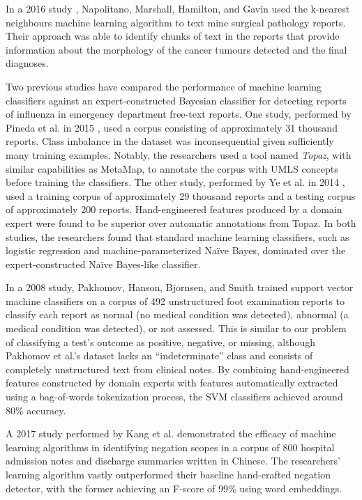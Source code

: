 \documentclass[sigconf]{acmart}
\newcommand{\naive}{Na\"ive }
\begin{document}
In a 2016 study \cite{napolitano2016machine}, Napolitano, Marshall, Hamilton, and Gavin used the k-nearest neighbours machine learning algorithm to text mine surgical pathology reports. Their approach was able to identify chunks of text in the reports that provide information about the morphology of the cancer tumours detected and the final diagnoses.

Two previous studies have compared the performance of machine learning classifiers against an expert-constructed Bayesian classifier for detecting reports of influenza in emergency department free-text reports. One study, performed by Pineda et al. in 2015 \cite{pineda2015comparison}, used a corpus consisting of approximately 31 thousand reports. Class imbalance in the dataset was inconsequential given sufficiently many training examples. Notably, the researchers used a tool named \textit{Topaz}, with similar capabilities as MetaMap, to annotate the corpus with UMLS concepts before training the classifiers. The other study, performed by Ye et al. in 2014 \cite{ye2014influenza}, used a training corpus of approximately 29 thousand reports and a testing corpus of approximately 200 reports. Hand-engineered features produced by a domain expert were found to be superior over automatic annotations from Topaz. In both studies, the researchers found that standard machine learning classifiers, such as logistic regression and machine-parameterized \naive Bayes, dominated over the expert-constructed \naive Bayes-like classifier.

In a 2008 study, Pakhomov, Hanson, Bjornsen, and Smith \cite{pakhomov2008automatic} trained support vector machine classifiers on a corpus of 492 unstructured foot examination reports to classify each report as normal (no medical condition was detected), abnormal (a medical condition was detected), or not assessed. This is similar to our problem of classifying a test's outcome as positive, negative, or missing, although Pakhomov et al.'s dataset lacks an ``indeterminate'' class and consists of completely unstructured text from clinical notes. By combining hand-engineered features constructed by domain experts with features automatically extracted using a bag-of-words tokenization process, the SVM classifiers achieved around 80\% accuracy.

A 2017 study performed by Kang et al. \cite{kang2017detecting} demonstrated the efficacy of machine learning algorithms in identifying negation scopes in a corpus of 800 hospital admission notes and discharge summaries written in Chinese. The researchers' learning algorithm vastly outperformed their baseline hand-crafted negation detector, with the former achieving an F-score of 99\% using word embeddings.
\end{document}
